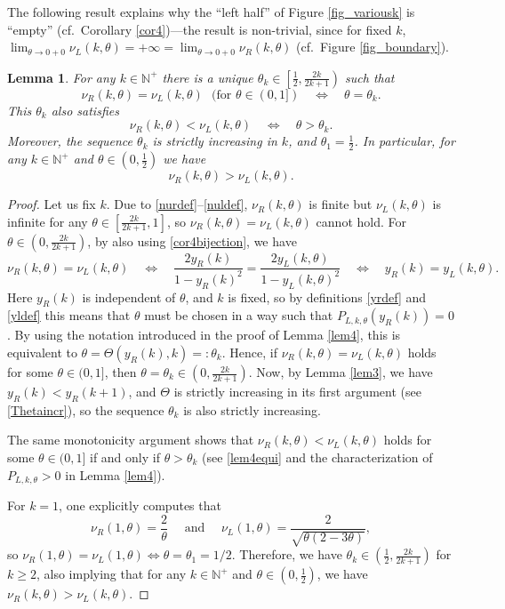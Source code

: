 \documentclass[a4paper]{article}
\newtheorem{lemma}{Lemma}
\newcommand{\te}{\theta}
\newcommand{\nul}{\nu_L(k,\theta)}
\newcommand{\nur}{\nu_R(k,\theta)}
\newcommand{\yl}{y_L(k,\theta)}
\newcommand{\yr}{y_R(k)}
\newcommand{\nplus}{\mathbb{N}^+}
\begin{document}
The following result explains why the ``left half'' of Figure \ref{fig_variousk} is ``empty'' (cf.~Corollary \ref{cor4})---the result is non-trivial, since for fixed $k$, $\lim_{\te\to 0+0} \nul=+\infty=\lim_{\te\to 0+0} \nur$ (cf.~Figure \ref{fig_boundary}).
\begin{lemma}\label{lem5} For any $k\in\nplus$ there is a unique $\te_k\in\left[\frac{1}{2},\frac{2k}{2k+1}\right)$  such that 
\[
\nur = \nul\ \ \  (\text{for } \te\in(0,1])\quad \Longleftrightarrow \quad \te= \te_k.
\]
This $\te_k$ also satisfies
\[
\nur < \nul\quad \Longleftrightarrow \quad \te> \te_k.
\]
Moreover, the sequence $\te_k$ is strictly increasing in $k$, and  $\te_1=\frac{1}{2}$. In particular, for any $k\in\nplus$ and $\te\in\left(0,\frac{1}{2}\right)$ we have 
\[
 \nur>\nul.
\] 
\end{lemma}
\begin{proof} Let us fix $k$. Due to \eqref{nurdef}--\eqref{nuldef}, $\nur$ is finite but $\nul$ is infinite for any $\te\in\left[\frac{2k}{2k+1},1\right]$, so $\nur = \nul$ cannot hold. For $\te\in\left(0,\frac{2k}{2k+1}\right)$, by also using \eqref{cor4bijection}, we have 
\[
\nur = \nul\quad \Longleftrightarrow \quad \frac{2\yr}{1-\yr^2}=\frac{2\yl}{1-\yl^2} \quad \Longleftrightarrow
\quad \yr=\yl.
\]
Here $\yr$ is independent of $\te$, and $k$ is fixed, so by definitions \eqref{yrdef} and \eqref{yldef} this means that $\te$ must be chosen in a way such that $P_{L,k,\te}(\yr)=0$. By using the notation introduced in the proof of Lemma \ref{lem4}, this is equivalent to $\te=\Theta(\yr,k)=:\te_k$. Hence, if $\nur = \nul$ holds for some $\te\in(0,1]$, then $\te=\te_k\in\left(0,\frac{2k}{2k+1}\right)$. Now, by Lemma \ref{lem3}, we have $\yr<y_R(k+1)$, and $\Theta$ is strictly increasing in its first argument (see \eqref{Thetaincr}), so the sequence $\te_k$ is also strictly increasing. 

The same monotonicity argument shows that $\nur < \nul$ holds for some $\te\in(0,1]$ if and only if $\te>\te_k$
(see \eqref{lem4equi} and the characterization of  $P_{L,k,\te}>0$ in Lemma \ref{lem4}). 

For $k=1$, one explicitly computes that
\begin{equation}\label{nurl1thetaconcrete}
\nu_R(1,\theta)=\frac{2}{\te}\quad\text{ and }\quad\nu_L(1,\theta)=\frac{2}{\sqrt{\theta  (2-3 \theta)}},
\end{equation}
so $\nu_R(1,\theta)=\nu_L(1,\theta) \Longleftrightarrow \te=\te_1=1/2$. Therefore, we have
$\te_k\in\left(\frac{1}{2},\frac{2k}{2k+1}\right)$ for $k\ge 2$, also implying that for any $k\in\nplus$ and 
$\te\in\left(0,\frac{1}{2}\right)$, we have $\nur>\nul$.
\end{proof}
\end{document}

